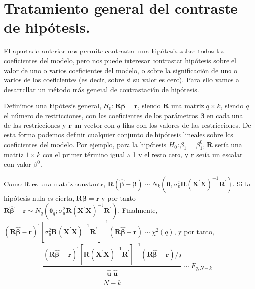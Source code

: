 \section{Tratamiento general del contraste de hip\'otesis.}

El apartado anterior nos permite contrastar una hip\'otesis sobre todos
los coeficientes del modelo, pero nos puede interesar contrastar hip\'otesis
sobre el valor de uno o varios coeficientes del modelo, o sobre la
significaci\'on de uno o varios de los coeficientes (es decir, sobre
si su valor es cero). Para ello vamos a desarrollar un m\'etodo m\'as
general de contrastaci\'on de hip\'otesis.

Definimos una hip\'otesis general, $H_{0}:\boldsymbol{R}\boldsymbol{\beta}=\boldsymbol{r}$,
siendo $\boldsymbol{R}$ una matriz $q\times k$, siendo $q$ el n\'umero
de restricciones, con los coeficientes de los par\'ametros $\boldsymbol{\beta}$
en cada una de las restricciones y $\boldsymbol{r}$ un vector con
$q$ filas con los valores de las restricciones. De esta forma podemos
definir cualquier conjunto de hip\'otesis lineales sobre los coeficientes
del modelo. Por ejemplo, para la hip\'otesis $H_{0}:\beta_{1}=\beta_{1}^{0}$,
$\boldsymbol{R}$ ser\'ia una matriz $1\times k$ con el primer t\'ermino
igual a 1 y el resto cero, y $\boldsymbol{r}$ ser\'ia un escalar con
valor $\beta^{0}$.

Como $\boldsymbol{R}$ es una matriz constante, $\boldsymbol{R}\left(\hat{\boldsymbol{\beta}}-\boldsymbol{\beta}\right)\sim N_{k}\left(\boldsymbol{0};\sigma_{u}^{2}\boldsymbol{R}\left(\boldsymbol{X}^{\prime}\boldsymbol{X}\right)^{-1}\boldsymbol{R}^{\prime}\right)$.
Si la hip\'otesis nula es cierta, $\boldsymbol{R}\boldsymbol{\beta}=\boldsymbol{r}$
y por tanto $\boldsymbol{R}\hat{\boldsymbol{\beta}}-\boldsymbol{r}\sim N_{q}\left(\boldsymbol{0}_{q};\sigma_{u}^{2}\boldsymbol{R}\left(\boldsymbol{X}^{\prime}\boldsymbol{X}\right)^{-1}\boldsymbol{R}^{\prime}\right)$.
Finalmente, $\left(\boldsymbol{R}\hat{\boldsymbol{\beta}}-\boldsymbol{r}\right)^{\prime}\left[\sigma_{u}^{2}\boldsymbol{R}\left(\boldsymbol{X}^{\prime}\boldsymbol{X}\right)^{-1}\boldsymbol{R}^{\prime}\right]^{-1}\left(\boldsymbol{R}\hat{\boldsymbol{\beta}}-\boldsymbol{r}\right)\sim\chi^{2}(q)$,
y por tanto,
\[
\dfrac{\left(\boldsymbol{R}\hat{\boldsymbol{\beta}}-\boldsymbol{r}\right)^{\prime}\left[\boldsymbol{R}\left(\boldsymbol{X}^{\prime}\boldsymbol{X}\right)^{-1}\boldsymbol{R}^{\prime}\right]^{-1}\left(\boldsymbol{R}\hat{\boldsymbol{\beta}}-\boldsymbol{r}\right)/q}{\dfrac{\hat{\boldsymbol{u}}^{\prime}\hat{\boldsymbol{u}}}{N-k}}\sim F_{q,N-k}
\]


